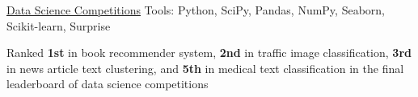 \begin{cventries}

  \cventryprojects
    {\href{https://github.com/k-chuang/data-science-competitions}{Data Science Competitions}} %
    {Tools: Python, SciPy, Pandas, NumPy, Seaborn, Scikit-learn, Surprise} %
    {
      \begin{cvitems} %
        \item {Ranked \textbf{1st} in book recommender system, \textbf{2nd} in traffic image classification, \textbf{3rd} in news article text clustering, and \textbf{5th} in medical text classification in the final leaderboard of data science competitions}
      \end{cvitems}
    }


\end{cventries}
